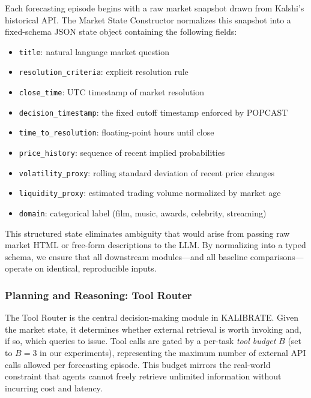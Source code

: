 \documentclass{article} %
\newcommand{\agentname}{KALIBRATE}
\newcommand{\benchmarkname}{POPCAST}
\newcommand{\kalshi}{Kalshi}
\begin{document}
Each forecasting episode begins with a raw market snapshot drawn from \kalshi{}'s historical API. The Market State Constructor normalizes this snapshot into a fixed-schema JSON state object containing the following fields:

\begin{itemize}[noitemsep]
    \item \texttt{title}: natural language market question
    \item \texttt{resolution\_criteria}: explicit resolution rule
    \item \texttt{close\_time}: UTC timestamp of market resolution
    \item \texttt{decision\_timestamp}: the fixed cutoff timestamp enforced by \benchmarkname{}
    \item \texttt{time\_to\_resolution}: floating-point hours until close
    \item \texttt{price\_history}: sequence of recent implied probabilities
    \item \texttt{volatility\_proxy}: rolling standard deviation of recent price changes
    \item \texttt{liquidity\_proxy}: estimated trading volume normalized by market age
    \item \texttt{domain}: categorical label (film, music, awards, celebrity, streaming)
\end{itemize}

This structured state eliminates ambiguity that would arise from passing raw market HTML or free-form descriptions to the LLM. By normalizing into a typed schema, we ensure that all downstream modules—and all baseline comparisons—operate on identical, reproducible inputs.

\subsubsection{Planning and Reasoning: Tool Router}

The Tool Router is the central decision-making module in \agentname{}. Given the market state, it determines whether external retrieval is worth invoking and, if so, which queries to issue. Tool calls are gated by a per-task \textit{tool budget} $B$ (set to $B = 3$ in our experiments), representing the maximum number of external API calls allowed per forecasting episode. This budget mirrors the real-world constraint that agents cannot freely retrieve unlimited information without incurring cost and latency.
\end{document}
